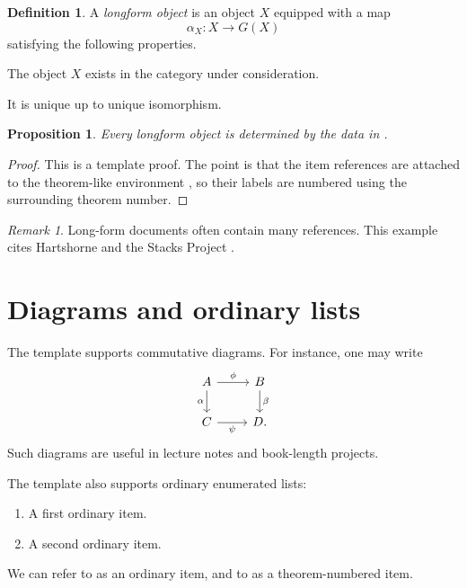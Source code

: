 \documentclass[12pt,a4paper]{report}
\theoremstyle{plain}
\newtheorem{proposition}[theorem]{Proposition}
\theoremstyle{definition}
\newtheorem{definition}[theorem]{Definition}
\theoremstyle{remark}
\newtheorem{remark}[theorem]{Remark}
\numberwithin{equation}{section}
\begin{document}
\begin{definition}
    \label{definition:longform-object}
    A \emph{longform object} is an object \(X\) equipped with a map
    \[
        \alpha_X \colon X \to G(X)
    \]
    satisfying the following properties.
    \begin{theoremitems}
    \item The object \(X\) exists in the category under consideration.
        \label{item:longform-existence}
    \item It is unique up to unique isomorphism.
        \label{item:longform-uniqueness} 
    \end{theoremitems}
\end{definition}

\begin{proposition}
    \label{proposition:longform-main}
    Every longform object is determined by the data in
    .
\end{proposition}

\begin{proof}
    This is a template proof. The point is that the item references are attached to
    the theorem-like environment , so their labels
    are numbered using the surrounding theorem number.
\end{proof}

\begin{remark}
    \label{remark:longform-citations}
    Long-form documents often contain many references.
    This example cites Hartshorne \cite{har77} and the Stacks Project \cite{stacks}.
\end{remark}

\section{Diagrams and ordinary lists}

The template supports commutative diagrams. For instance, one may write
\[
    \begin{tikzcd}
        A \arrow[r, "\phi"] \arrow[d, "\alpha"'] &
        B \arrow[d, "\beta"] \\
        C \arrow[r, "\psi"'] &
        D .
    \end{tikzcd}
\]
Such diagrams are useful in lecture notes and book-length projects.

The template also supports ordinary enumerated lists:
\begin{enumerate}[label=(\alph*), ref=(\alph*)]
    \item A first ordinary item.
        \label{item:longform-ordinary-first} 
    \item A second ordinary item.
        \label{item:longform-ordinary-second} 
\end{enumerate}
We can refer to  as an ordinary item, and
to  as a theorem-numbered item.
\end{document}
